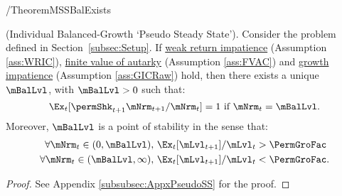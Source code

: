 \documentclass[BufferStockTheory]{subfiles}
\begin{document}
\begin{verbatimwrite}{\EqDir/TheoremMSSBalExists}
  \begin{theorem}(Individual Balanced-Growth `Pseudo Steady State').
    Consider the problem defined in Section~\ref{subsec:Setup}.
If \hyperlink{WRIC}{weak return impatience} (Assumption \ref{ass:WRIC}), \hyperlink{FVAC}{finite value of autarky} (Assumption \ref{ass:FVAC}) and \hyperlink{GIC}{growth impatience} (Assumption \ref{ass:GICRaw}) hold, then there exists a unique $\mBalLvl$, with $\mBalLvl>0$ such that:
    \begin{equation}
      \Ex_t [\permShk_{t+1}{\mNrm}_{t+1}/\mNrm_t] = 1 \mbox{~if~} \mNrm_t = \mBalLvl.
      \label{eq:mBalLvl}
    \end{equation}
    Moreover, $\mBalLvl$ is a point of stability in the sense that:
    \begin{equation}
      \label{eq:stabilityStE}
      \begin{split}
        \forall {\mNrm}_t\in(0,\mBalLvl),      \,\,& \Ex_{t}[\mLvl_{t+1}]/\mLvl_{t} > \PermGroFac \\
        \forall {\mNrm}_t\in(\mBalLvl,\infty), \,\,& \Ex_{t}[\mLvl_{t+1}]/\mLvl_{t} < \PermGroFac.
      \end{split}
    \end{equation}
  \end{theorem}
\end{verbatimwrite} \unskip

\begin{proof}
See Appendix \ref{subsubsec:AppxPseudoSS} for the proof.

\end{proof}
\end{document}
